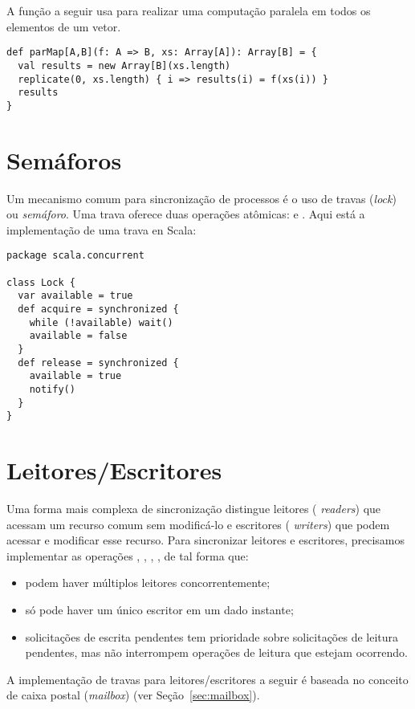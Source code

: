 A função a seguir usa  para realizar uma computação paralela
em todos os elementos de um vetor.

\begin{lstlisting}
def parMap[A,B](f: A => B, xs: Array[A]): Array[B] = {
  val results = new Array[B](xs.length)
  replicate(0, xs.length) { i => results(i) = f(xs(i)) }
  results
}
\end{lstlisting}

\section{Semáforos}

Um mecanismo comum para sincronização de processos é o uso de travas ({\em lock}) ou
{\em semáforo}. Uma trava oferece duas operações atômicas:  e . Aqui está a implementação de uma trava en Scala:

\begin{lstlisting}
package scala.concurrent

class Lock {
  var available = true
  def acquire = synchronized {
    while (!available) wait()
    available = false
  }
  def release = synchronized {
    available = true
    notify()
  }
}
\end{lstlisting}

\section{Leitores/Escritores}

Uma forma mais complexa de sincronização distingue leitores ({\em
readers}) que acessam um recurso comum sem modificá-lo e escritores ({\em
writers}) que podem acessar e modificar esse recurso. Para sincronizar leitores e escritores, precisamos implementar as operações , ,
, , de tal forma que:
\begin{itemize}
\item podem haver múltiplos leitores concorrentemente;
\item só pode haver um único escritor em um dado instante;
\item solicitações de escrita pendentes tem prioridade sobre solicitações de leitura pendentes, mas não interrompem operações de
leitura que estejam ocorrendo.
\end{itemize}
A implementação de travas para leitores/escritores a seguir é baseada no conceito de caixa postal ({\em mailbox}) (ver Seção~\ref{sec:mailbox}).

